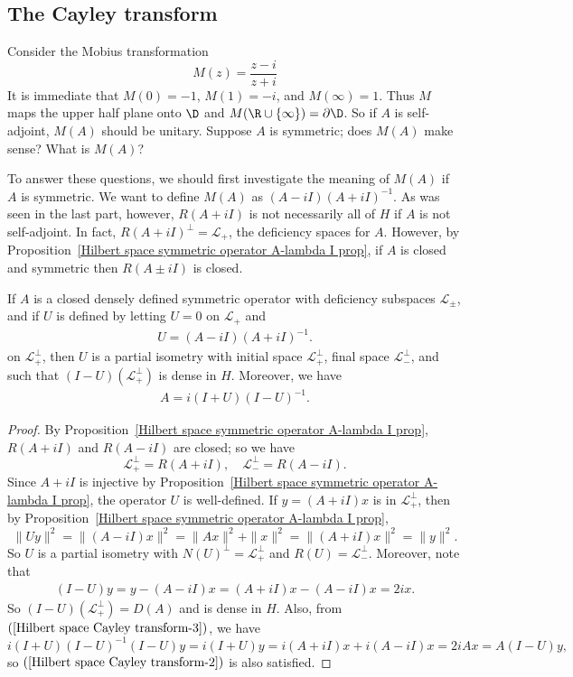 \subsection{The Cayley transform}
Consider the Mobius transformation
\[M(z)=\frac{z-i}{z+i}\]
It is immediate that $M(0)=-1$, $M(1)=-i$, and $M(\infty)=1$. Thus $M$ maps the upper half plane onto $\D$ and $M(\R\cup\{\infty\})=\partial\D$. So if $A$ is self-adjoint, $M(A)$ should be unitary. Suppose $A$ is symmetric; does $M(A)$ make sense? What is $M(A)$?\par
To answer these questions, we should first investigate the meaning of $M(A)$ if $A$ is symmetric. We want to define $M(A)$ as $(A-iI)(A+iI)^{-1}$. As was seen in the last part, however, $R(A+iI)$ is not necessarily all of $H$ if $A$ is not self-adjoint. In fact, $R(A+iI)^\bot=\mathscr{L}_+$, the deficiency spaces for $A$. However, by Proposition~\ref{Hilbert space symmetric operator A-lambda I prop}, if $A$ is closed and symmetric then $R(A\pm iI)$ is closed.
\begin{theorem}\label{Hilbert space Cayley transform}
If $A$ is a closed densely defined symmetric operator with deficiency subspaces $\mathscr{L}_\pm$, and if $U$ is defined by letting $U=0$ on $\mathscr{L}_+$ and
\begin{align}\label{Hilbert space Cayley transform-1}
U=(A-iI)(A+iI)^{-1}.
\end{align}
on $\mathscr{L}_+^\bot$, then $U$ is a partial isometry with initial space $\mathscr{L}_+^\bot$, final space $\mathscr{L}_-^\bot$, and such that $(I-U)(\mathscr{L}_+^\bot)$ is dense in $H$. Moreover, we have
\begin{align}\label{Hilbert space Cayley transform-2}
A=i(I+U)(I-U)^{-1}.
\end{align}
\end{theorem}
\begin{proof}
By Proposition~\ref{Hilbert space symmetric operator A-lambda I prop}, $R(A+iI)$ and $R(A-iI)$ are closed; so we have
\[\mathscr{L}_{+}^\bot=R(A+iI),\quad \mathscr{L}_-^\bot=R(A-iI).\]
Since $A+iI$ is injective by Proposition~\ref{Hilbert space symmetric operator A-lambda I prop}, the operator $U$ is well-defined. If $y=(A+iI)x$ is in $\mathscr{L}_+^\bot$, then by Proposition~\ref{Hilbert space symmetric operator A-lambda I prop},
\[\|Uy\|^2=\|(A-iI)x\|^2=\|Ax\|^2+\|x\|^2=\|(A+iI)x\|^2=\|y\|^2.\]
So $U$ is a partial isometry with $N(U)^\bot=\mathscr{L}_+^\bot$ and $R(U)=\mathscr{L}_-^\bot$. Moreover, note that
\begin{align}\label{Hilbert space Cayley transform-3}
(I-U)y=y-(A-iI)x=(A+iI)x-(A-iI)x=2ix.
\end{align}
So $(I-U)(\mathscr{L}_+^\bot)=D(A)$ and is dense in $H$. Also, from $(\ref{Hilbert space Cayley transform-3})$, we have
\[i(I+U)(I-U)^{-1}(I-U)y=i(I+U)y=i(A+iI)x+i(A-iI)x=2iAx=A(I-U)y,\]
so $(\ref{Hilbert space Cayley transform-2})$ is also satisfied.
\end{proof}
